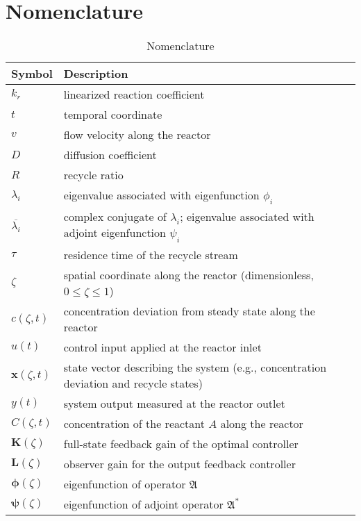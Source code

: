 \newpage
\section*{Nomenclature}
\begin{table}[ht]
\centering
\caption{Nomenclature}
\begin{tabular}{ll}
\toprule
\textbf{Symbol} & \textbf{Description} \\
\midrule
$k_r$ & linearized reaction coefficient \\
$t$ & temporal coordinate \\
$v$ & flow velocity along the reactor \\
$D$ & diffusion coefficient \\
$R$ & recycle ratio \\
$\lambda_i$ & eigenvalue associated with eigenfunction $\phi_i$ \\
$\overline{\lambda_i}$ & complex conjugate of $\lambda_i$; eigenvalue associated with adjoint eigenfunction $\psi_i$ \\
$\tau$ & residence time of the recycle stream \\
$\zeta$ & spatial coordinate along the reactor (dimensionless, $0 \leq \zeta \leq 1$) \\

$c(\zeta, t)$ & concentration deviation from steady state along the reactor \\
$u(t)$ & control input applied at the reactor inlet \\
$\bm{x}(\zeta, t)$ & state vector describing the system (e.g., concentration deviation and recycle states) \\
$y(t)$ & system output measured at the reactor outlet \\
$C(\zeta, t)$ & concentration of the reactant $A$ along the reactor \\
$\bm{K}(\zeta)$ & full-state feedback gain of the optimal controller \\
$\bm{L}(\zeta)$ & observer gain for the output feedback controller \\
$\bm{\phi}(\zeta)$ & eigenfunction of operator $\mathfrak{A}$ \\
$\bm{\psi}(\zeta)$ & eigenfunction of adjoint operator $\mathfrak{A}^*$ \\


\end{tabular}
\end{table}
